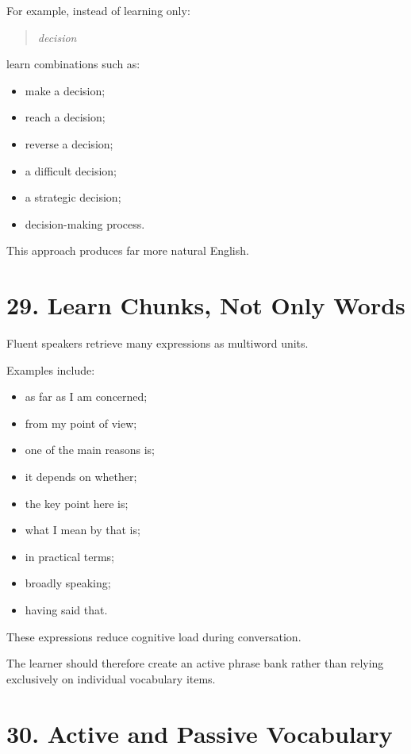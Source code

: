 For example, instead of learning only:

\begin{quote}
\textit{decision}
\end{quote}

learn combinations such as:

\begin{itemize}
    \item make a decision;
    \item reach a decision;
    \item reverse a decision;
    \item a difficult decision;
    \item a strategic decision;
    \item decision-making process.
\end{itemize}

This approach produces far more natural English.

\section*{29. Learn Chunks, Not Only Words}

Fluent speakers retrieve many expressions as multiword units.

Examples include:

\begin{itemize}
    \item as far as I am concerned;
    \item from my point of view;
    \item one of the main reasons is;
    \item it depends on whether;
    \item the key point here is;
    \item what I mean by that is;
    \item in practical terms;
    \item broadly speaking;
    \item having said that.
\end{itemize}

These expressions reduce cognitive load during conversation.

The learner should therefore create an active phrase bank rather than relying exclusively on individual vocabulary items.

\section*{30. Active and Passive Vocabulary}

